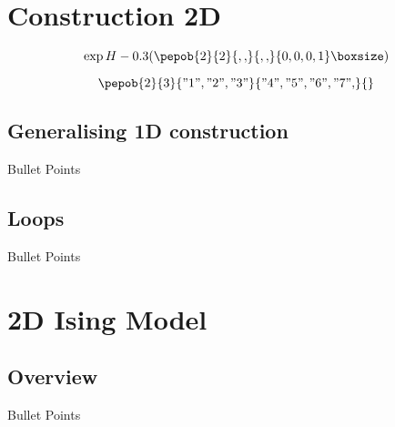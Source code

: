 \documentclass[aspectratio=169]{beamer}
\begin{document}
\section{Construction 2D}
\begin{frame}
    \begin{equation}
        \exp H \left(  \pepob{2}{2}{{,,}}{{,,}}{{0,0,0,1}} \right)
    \end{equation}
\end{frame}

\begin{frame}
    \begin{equation}
        \pepob{2}{3}{{"1","2","3"}}{{"4","5","6","7",} }{}
    \end{equation}
\end{frame}


\subsection{Generalising 1D construction}
\begin{frame}{Bullet Points}

\end{frame}
\subsection{Loops}
\begin{frame}{Bullet Points}

\end{frame}
\section{2D Ising Model}

\subsection{Overview}
\begin{frame}{Bullet Points}

\end{frame}
\end{document}
